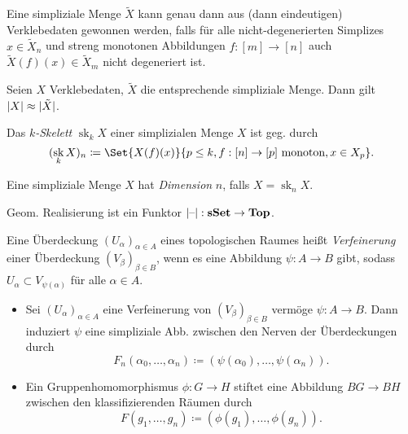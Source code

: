\documentclass{cheat-sheet}
\DeclareMathOperator{\sk}{sk} %
\begin{document}
\begin{prop}
  Eine simpliziale Menge $\tilde{X}$ kann genau dann aus (dann eindeutigen) Verklebedaten gewonnen werden, falls für alle nicht-degenerierten Simplizes $x \in \tilde{X}_n$ und streng monotonen Abbildungen $f : [m] \to [n]$ auch $\tilde{X}(f)(x) \in \tilde{X}_m$ nicht degeneriert ist.
\end{prop}


\begin{prop}
  Seien $X$ Verklebedaten, $\tilde{X}$ die entsprechende simpliziale Menge. Dann gilt $\lvert X\rvert \approx \lvert\tilde{X}\rvert$.
\end{prop}

\begin{defn}
  Das \emph{$k$-Skelett} $\sk_k X$ einer simplizialen Menge $X$ ist geg. durch
  \[ (\sk_k X)_n \coloneqq \Set{ X(f)(x) }{ p \leq k, f : [n] \to [p] \text{ monoton}, x \in X_p }. \]
\end{defn}

\begin{defn}
  Eine simpliziale Menge $X$ hat \emph{Dimension} $n$, falls $X = \sk_n X$.
\end{defn}

\begin{prop}
  Geom. Realisierung ist ein Funktor $\lvert\text{--}\rvert : \mathbf{sSet} \to \mathbf{Top}$.
\end{prop}

\begin{defn}
  Eine Überdeckung $(U_\alpha)_{\alpha \in A}$ eines topologischen Raumes heißt \emph{Verfeinerung} einer Überdeckung $(V_\beta)_{\beta \in B}$, wenn es eine Abbildung $\psi : A \to B$ gibt, sodass $U_\alpha \subset V_{\psi(\alpha)}$ für alle $\alpha \in A$.
\end{defn}

\begin{bspe}
  \begin{itemize}
    \item Sei $(U_\alpha)_{\alpha \in A}$ eine Verfeinerung von $(V_\beta)_{\beta \in B}$ vermöge $\psi : A \to B$.
    Dann induziert $\psi$ eine simpliziale Abb. zwischen den Nerven der Überdeckungen durch
    \[ F_n(\alpha_0, \ldots, \alpha_n) \coloneqq (\psi(\alpha_0), \ldots, \psi(\alpha_n)). \]
    \item Ein Gruppenhomomorphismus $\phi : G \to H$ stiftet eine Abbildung $BG \to BH$ zwischen den klassifizierenden Räumen durch
    \[ F(g_1, \ldots, g_n) \coloneqq (\phi(g_1), \ldots, \phi(g_n)). \]
  \end{itemize}
\end{bspe}
\end{document}
